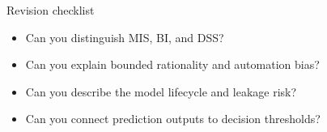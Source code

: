 \documentclass[aspectratio=169,11pt]{beamer}
\begin{document}

\begin{frame}{Revision checklist}
  \begin{itemize}
    \item Can you distinguish MIS, BI, and DSS?
    \item Can you explain bounded rationality and automation bias?
    \item Can you describe the model lifecycle and leakage risk?
    \item Can you connect prediction outputs to decision thresholds?
  \end{itemize}
\end{frame}
\end{document}

